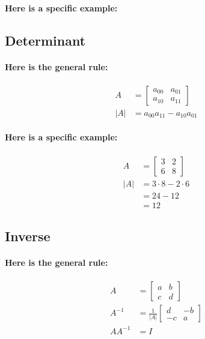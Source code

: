 \documentclass[twoside]{article}
\begin{document}
\paragraph{Here is a specific example:}

\subsection{Determinant}

\paragraph{Here is the general rule:}

\begin{align*}
  A & = \left[ \begin{array}{rr}
    a_{00} & a_{01} \\
    a_{10} & a_{11} 
    \end{array} \right] \\
  |A| & = a_{00} a_{11} - a_{10} a_{01}
  \end{align*}

\paragraph{Here is a specific example:}

\begin{align*}
  A & = \left[ \begin{array}{rr}
    3 & 2 \\
    6 & 8
    \end{array} \right] \\
  |A| & = 3 \cdot 8 - 2 \cdot 6 \\
      & = 24 - 12 \\
      & = 12
  \end{align*}

\subsection{Inverse}

\paragraph{Here is the general rule:}

\begin{align*}
  A & = \left[ \begin{array}{rr}
    a & b \\
    c & d 
    \end{array} \right] \\
  A^{-1} & = \frac{1}{|A|} \left[ \begin{array}{rr}
    d & -b \\
    -c & a
    \end{array} \right] \\
  A A^{-1} & = I
  \end{align*}
\end{document}
